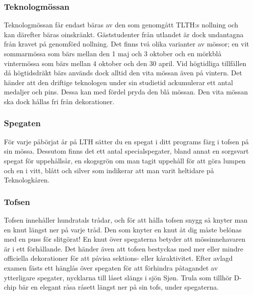 \documentclass{article}
\begin{document}
\newpage
\subsubsection{Teknologmössan}
Teknologmössan får endast bäras av den som genomgått
TLTH:s nollning och kan därefter bäras oinskränkt.
Gäststudenter från utlandet är dock undantagna från
kravet på genomförd nollning. Det finns två olika varianter
av mössor; en vit sommarmössa som bärs mellan den 1
maj och 3 oktober och en mörkblå vintermössa som bärs
mellan 4 oktober och den 30 april. Vid högtidliga tillfällen
då högtidsdräkt bärs används dock alltid den vita mössan
även på vintern.
Det händer att den driftige teknologen under sin studietid
ackumulerar ett antal medaljer och pins. Dessa kan med
fördel pryda den blå mössan. Den vita mössan ska dock
hållas fri från dekorationer.



\subsubsection{Spegaten}
För varje påbörjat år på LTH sätter du en spegat i ditt
programs färg i tofsen på sin mössa. Dessutom finns det
ett antal specialspegater, bland annat en sorgsvart
spegat för uppehållsår, en skogsgrön om man tagit
uppehåll för att göra lumpen och en i vitt, blått och silver
som indikerar att man varit heltidare på Teknologkåren.

\subsubsection{Tofsen}
Tofsen innehåller hundratals trådar, och för att hålla
tofsen snygg så knyter man en knut längst ner på varje
tråd. Den som knyter en knut åt dig måste belönas med
en puss för slitgörat! En knut över spegaterna betyder att
mössinnehavaren är i ett förhållande. Det händer även att
tofsen bestyckas med mer eller mindre officiella
dekorationer för att påvisa sektions- eller kåraktivitet. Efter
avlagd examen fästs ett hänglås över spegaten för att
förhindra påtagandet av ytterligare spegater, nycklarna till
låset slängs i sjön Sjøn. Trula som tillhör D-chip bär en
elegant råsa råsett längst ner på sin tofs, under
spegaterna.
\newpage
\end{document}
